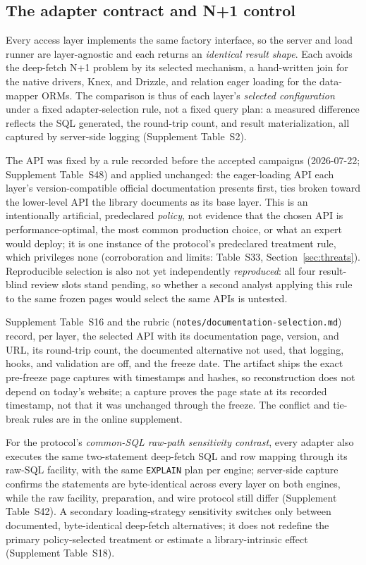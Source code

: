 \subsection{The adapter contract and N+1 control}
\label{sec:adapter}
Every access layer implements the same factory interface, so the server and load runner are layer-agnostic and each returns an \emph{identical result shape}.
Each avoids the deep-fetch N+1 problem by its selected mechanism, a hand-written join for the native drivers, Knex, and Drizzle, and relation eager loading for the data-mapper ORMs.
The comparison is thus of each layer's \emph{selected configuration} under a fixed adapter-selection rule, not a fixed query plan: a measured difference reflects the SQL generated, the round-trip count, and result materialization, all captured by server-side logging (Supplement Table~S2).

The API was fixed by a rule recorded before the accepted campaigns (2026-07-22; Supplement Table~S48) and applied unchanged: the eager-loading API each layer's version-compatible official documentation presents first, ties broken toward the lower-level API the library documents as its base layer.
This is an intentionally artificial, predeclared \emph{policy}, not evidence that the chosen API is performance-optimal, the most common production choice, or what an expert would deploy; it is one instance of the protocol's predeclared treatment rule, which privileges none (corroboration and limits: Table~S33, Section~\ref{sec:threats}).
Reproducible selection is also not yet independently \emph{reproduced}: all four result-blind review slots stand pending, so whether a second analyst applying this rule to the same frozen pages would select the same APIs is untested.

Supplement Table~S16 and the rubric (\texttt{notes/\allowbreak documentation-selection.md}) record, per layer, the selected API with its documentation page, version, and URL, its round-trip count, the documented alternative not used, that logging, hooks, and validation are off, and the freeze date.
The artifact ships the exact pre-freeze page captures with timestamps and hashes, so reconstruction does not depend on today's website; a capture proves the page state at its recorded timestamp, not that it was unchanged through the freeze.
The conflict and tie-break rules are in the online supplement.

For the protocol's \emph{common-SQL raw-path sensitivity contrast}, every adapter also executes the same two-statement deep-fetch SQL and row mapping through its raw-SQL facility, with the same \texttt{EXPLAIN} plan per engine; server-side capture confirms the statements are byte-identical across every layer on both engines, while the raw facility, preparation, and wire protocol still differ (Supplement Table~S42).
A secondary loading-strategy sensitivity switches only between documented, byte-identical deep-fetch alternatives; it does not redefine the primary policy-selected treatment or estimate a library-intrinsic effect (Supplement Table~S18).

